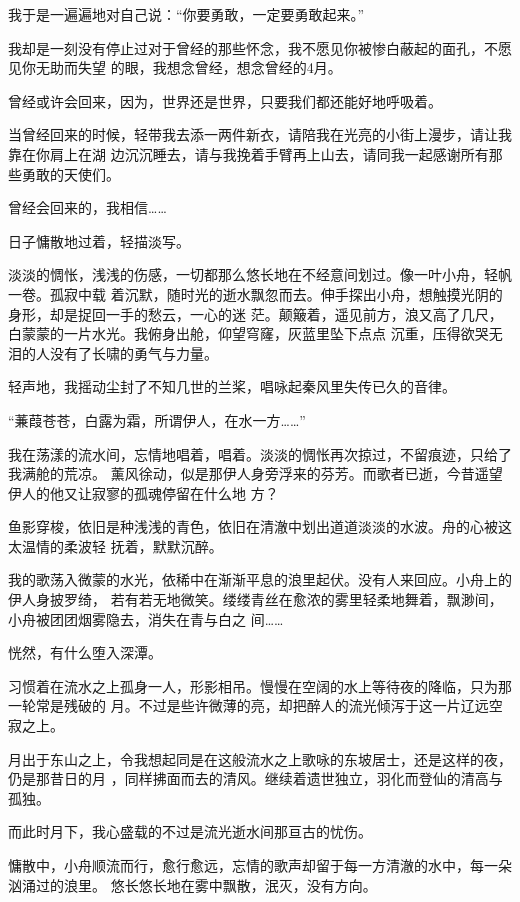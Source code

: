 \documentclass[12pt,a4paper]{article}
\begin{document}
		我于是一遍遍地对自己说：“你要勇敢，一定要勇敢起来。”

		我却是一刻没有停止过对于曾经的那些怀念，我不愿见你被惨白蔽起的面孔，不愿见你无助而失望
	的眼，我想念曾经，想念曾经的4月。

		曾经或许会回来，因为，世界还是世界，只要我们都还能好地呼吸着。

		当曾经回来的时候，轻带我去添一两件新衣，请陪我在光亮的小街上漫步，请让我靠在你肩上在湖
	边沉沉睡去，请与我挽着手臂再上山去，请同我一起感谢所有那些勇敢的天使们。

		曾经会回来的，我相信……

	\endwriting



		日子慵散地过着，轻描淡写。

		淡淡的惆怅，浅浅的伤感，一切都那么悠长地在不经意间划过。像一叶小舟，轻帆一卷。孤寂中载
	着沉默，随时光的逝水飘忽而去。伸手探出小舟，想触摸光阴的身形，却是捉回一手的愁云，一心的迷
	茫。颠簸着，遥见前方，浪又高了几尺，白蒙蒙的一片水光。我俯身出舱，仰望穹窿，灰蓝里坠下点点
	沉重，压得欲哭无泪的人没有了长啸的勇气与力量。

		轻声地，我摇动尘封了不知几世的兰桨，唱咏起秦风里失传已久的音律。

		“蒹葭苍苍，白露为霜，所谓伊人，在水一方……”

		我在荡漾的流水间，忘情地唱着，唱着。淡淡的惆怅再次掠过，不留痕迹，只给了我满舱的荒凉。
	薰风徐动，似是那伊人身旁浮来的芬芳。而歌者已逝，今昔遥望伊人的他又让寂寥的孤魂停留在什么地
	方？

		鱼影穿梭，依旧是种浅浅的青色，依旧在清澈中划出道道淡淡的水波。舟的心被这太温情的柔波轻
	抚着，默默沉醉。

		我的歌荡入微蒙的水光，依稀中在渐渐平息的浪里起伏。没有人来回应。小舟上的伊人身披罗绮，
	若有若无地微笑。缕缕青丝在愈浓的雾里轻柔地舞着，飘渺间，小舟被团团烟雾隐去，消失在青与白之
	间……

		恍然，有什么堕入深潭。

		习惯着在流水之上孤身一人，形影相吊。慢慢在空阔的水上等待夜的降临，只为那一轮常是残破的
	月。不过是些许微薄的亮，却把醉人的流光倾泻于这一片辽远空寂之上。

		月出于东山之上，令我想起同是在这般流水之上歌咏的东坡居士，还是这样的夜，仍是那昔日的月
	，同样拂面而去的清风。继续着遗世独立，羽化而登仙的清高与孤独。

		而此时月下，我心盛载的不过是流光逝水间那亘古的忧伤。

		慵散中，小舟顺流而行，愈行愈远，忘情的歌声却留于每一方清澈的水中，每一朵汹涌过的浪里。
	悠长悠长地在雾中飘散，泯灭，没有方向。
\end{document}
